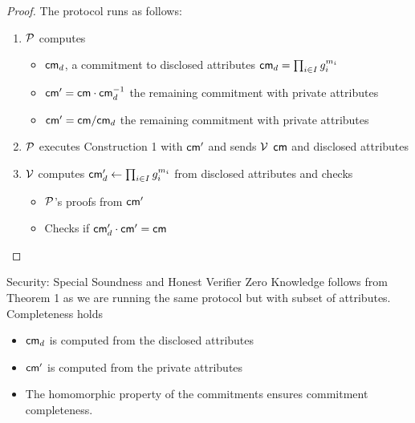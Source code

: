 \begin{proof}
   The protocol runs as follows:
    \begin{enumerate}
        \item $\mathcal{P}$ computes
            \begin{itemize}
                \item  $\mathsf{cm}_d$, a commitment to disclosed attributes $\mathsf{cm}_d = \prod_{i \in I}g_i^{m_i}$
                \item $\mathsf{cm}' = \mathsf{cm} \cdot \mathsf{cm}_d^{-1}$ the remaining commitment with private attributes
                \item $\mathsf{cm}' = \mathsf{cm} / \mathsf{cm}_d$ the remaining commitment with private attributes
            \end{itemize}
        \item $\mathcal{P}$ executes Construction 1 with $\mathsf{cm}'$ and sends $\mathcal{V}$ $\mathsf{cm}$ and disclosed attributes 
        \item $\mathcal{V}$ computes $\mathsf{cm}_d' \gets \prod_{i \in I}g_i^{m_i}$ from disclosed attributes and checks
        \begin{itemize}
            \item $\mathcal{P}$'s proofs from $\mathsf{cm}'$
            \item  Checks if $\mathsf{cm}_d' \cdot \mathsf{cm}' = \mathsf{cm}$
        \end{itemize}
    \end{enumerate}
\end{proof}

\noindent Security: Special Soundness and Honest Verifier Zero Knowledge follows from Theorem 1 as we are running the same protocol but with subset of attributes. Completeness holds 
\begin{itemize}
    \item $\mathsf{cm}_d$ is computed from the disclosed attributes
    \item $\mathsf{cm}'$ is computed from the private attributes
    \item The homomorphic property of the commitments ensures commitment completeness.
\end{itemize}























